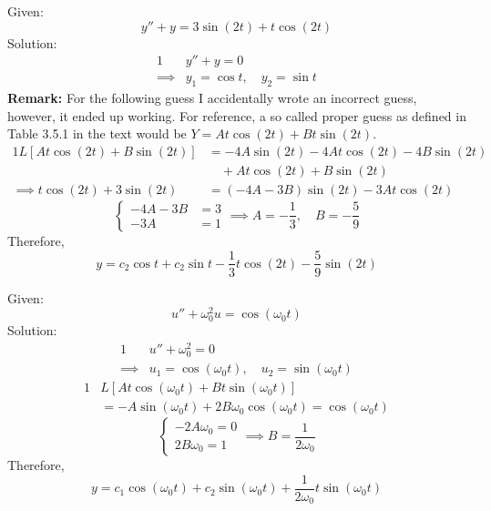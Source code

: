 \documentclass[diffeq.tex]{subfiles}
\begin{document}
\np
\begin{homework*}[141.7]
    Given:
    \begin{equation}
        y'' + y = 3\sin(2t) + t\cos(2t)
    \end{equation}
    Solution:
    \begin{alignat}{1}
        &y'' + y = 0\\
        \implies& y_{1} = \cos t,\quad y_{2} = \sin t
    \end{alignat}
    \textbf{Remark:} For the following guess I accidentally wrote an incorrect guess, however, it ended up working. For reference, a so called proper guess as defined in Table 3.5.1 in the text would be $Y = At\cos(2t) + Bt\sin(2t)$.
    \begin{alignat}{1}
        L[At\cos(2t) + B\sin(2t)] &= -4A\sin(2t)-4At\cos(2t)-4B\sin(2t)\\
        &\quad + At\cos(2t) + B\sin(2t)\\
        \implies  t\cos(2t)+3\sin(2t) &= (-4A-3B)\sin(2t) - 3At\cos(2t)
    \end{alignat}
    \begin{equation}
        \begin{cases}
            -4A - 3B &= 3\\
            -3A &= 1
        \end{cases}
        \implies A = -\frac{1}{3},\quad B = -\frac{5}{9}
    \end{equation}
    Therefore,
    \begin{equation}
        y = c_{2}\cos t + c_{2}\sin t - \frac{1}{3}t\cos(2t) - \frac{5}{9}\sin(2t)
    \end{equation}
\end{homework*}
\begin{homework*}[141.9]
    Given:
    \begin{equation}
        u'' + \omega_{0}^{2}u = \cos(\omega_{0}t)
    \end{equation}
    Solution:
    \begin{alignat}{1}
        &u'' + \omega_{0}^{2} = 0\\
        \implies& u_{1} = \cos(\omega_{0}t),\quad u_{2} = \sin(\omega_{0}t)
    \end{alignat}
    \begin{alignat}{1}
        &L[At\cos(\omega_{0}t) + Bt\sin(\omega_{0}t)]\\
        &= -A\sin(\omega_{0}t) + 2B\omega_{0}\cos(\omega_{0}t) = \cos(\omega_{0}t)
    \end{alignat}
    \begin{equation}
        \begin{cases}
            -2A\omega_{0} = 0\\
            2B\omega_{0} = 1
        \end{cases}
        \implies B = \frac{1}{2\omega_{0}}
    \end{equation}
    Therefore,
    \begin{equation}
        y = c_{1}\cos(\omega_{0}t) + c_{2}\sin(\omega_{0}t) + \frac{1}{2\omega_{0}}t\sin(\omega_{0}t)
    \end{equation}
\end{homework*}
\end{document}
